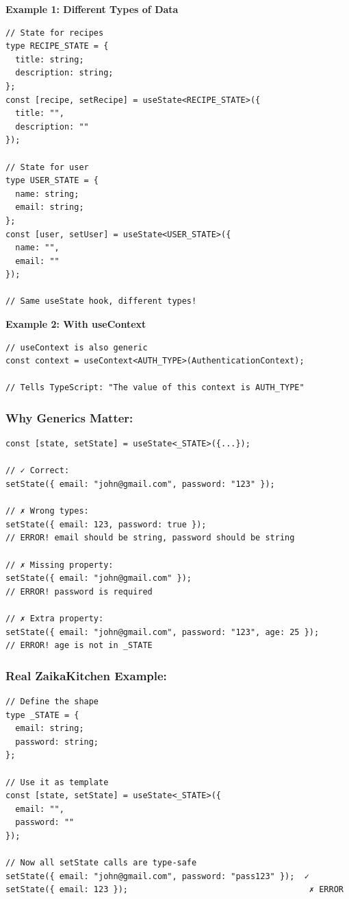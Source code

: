 \documentclass[12pt]{article}
\begin{document}
\textbf{Example 1: Different Types of Data}

\begin{lstlisting}
// State for recipes
type RECIPE_STATE = {
  title: string;
  description: string;
};
const [recipe, setRecipe] = useState<RECIPE_STATE>({
  title: "",
  description: ""
});

// State for user
type USER_STATE = {
  name: string;
  email: string;
};
const [user, setUser] = useState<USER_STATE>({
  name: "",
  email: ""
});

// Same useState hook, different types!
\end{lstlisting}

\textbf{Example 2: With useContext}

\begin{lstlisting}
// useContext is also generic
const context = useContext<AUTH_TYPE>(AuthenticationContext);

// Tells TypeScript: "The value of this context is AUTH_TYPE"
\end{lstlisting}

\subsubsection*{Why Generics Matter:}

\begin{lstlisting}
const [state, setState] = useState<_STATE>({...});

// ✓ Correct:
setState({ email: "john@gmail.com", password: "123" });

// ✗ Wrong types:
setState({ email: 123, password: true });  
// ERROR! email should be string, password should be string

// ✗ Missing property:
setState({ email: "john@gmail.com" });
// ERROR! password is required

// ✗ Extra property:
setState({ email: "john@gmail.com", password: "123", age: 25 });
// ERROR! age is not in _STATE
\end{lstlisting}

\subsubsection*{Real ZaikaKitchen Example:}

\begin{lstlisting}
// Define the shape
type _STATE = {
  email: string;
  password: string;
};

// Use it as template
const [state, setState] = useState<_STATE>({ 
  email: "", 
  password: "" 
});

// Now all setState calls are type-safe
setState({ email: "john@gmail.com", password: "pass123" });  ✓
setState({ email: 123 });                                     ✗ ERROR
\end{lstlisting}
\end{document}
